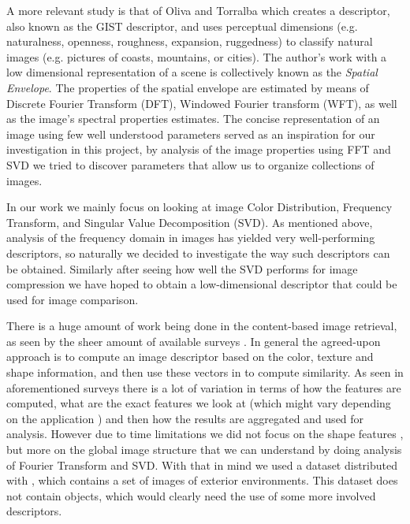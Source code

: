 \documentclass{report}
\begin{document}
A more relevant study is that of Oliva and Torralba \cite{gist_descriptor} which creates a descriptor, also known as the GIST descriptor, and uses perceptual dimensions (e.g. naturalness, openness, roughness, expansion, ruggedness) to classify natural images (e.g. pictures of coasts, mountains, or cities). The author's work with a low dimensional representation of a scene is collectively known as the \emph{Spatial Envelope}. The properties of the spatial envelope are estimated by means of Discrete Fourier Transform (DFT), Windowed Fourier transform (WFT), as well as the image's spectral properties estimates. The concise representation of an image using few well understood parameters served as an inspiration for our investigation in this project, by analysis of the image properties using FFT and SVD we tried to discover parameters that allow us to organize collections of images.

In our work we mainly focus on looking at image Color Distribution, Frequency Transform, and Singular Value Decomposition (SVD).
As mentioned above, analysis of the frequency domain in images has yielded very well-performing descriptors, so naturally we decided to investigate the way such descriptors can be obtained. Similarly after seeing how well the SVD performs for image compression we have hoped to obtain a low-dimensional descriptor that could be used for image comparison.

There is a huge amount of work being done in the content-based image retrieval, as seen by the sheer amount of available surveys \cite{survey1}\cite{survey2}\cite{survey3}. In general the agreed-upon approach is to compute an image descriptor based on the color, texture and shape information, and then use these vectors in to compute similarity. As seen in aforementioned surveys there is a lot of variation in terms of how the features are computed, what are the exact features we look at (which might vary depending on the application ) and then how the results are aggregated and used for analysis. However due to time limitations we did not focus on the shape features \cite{sift}, but more on the global image structure that we can understand by doing analysis of Fourier Transform and SVD. With that in mind we used a dataset distributed with \cite{gist_descriptor}, which contains a set of images of exterior environments. This dataset does not contain objects, which would clearly need the use of some more involved descriptors.

\end{document}
